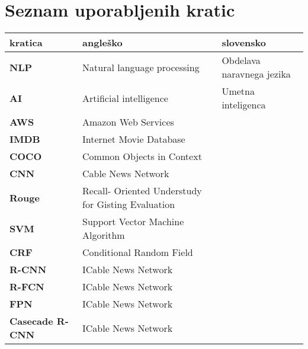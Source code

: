 \chapter*{Seznam uporabljenih kratic}
\begin{center}
\begin{tabular}{l|l|l}
  {\bf kratica} & {\bf angleško} & {\bf slovensko} \\ \hline
    {\bf NLP} & Natural language processing & Obdelava naravnega jezika\\
  {\bf AI} & Artificial intelligence & Umetna inteligenca \\
  {\bf AWS} & Amazon Web Services \\
  {\bf IMDB} & Internet Movie Database  \\
    {\bf COCO} & Common Objects in Context \\
      {\bf CNN} & Cable News Network  \\
        {\bf Rouge} & Recall- Oriented 
        Understudy for Gisting Evaluation \\
          {\bf SVM} & Support Vector Machine Algorithm  \\
          {\bf CRF} & Conditional Random Field  \\
          {\bf R-CNN} & ICable News Network  \\
          {\bf R-FCN} & ICable News Network  \\
          {\bf FPN} & ICable News Network  \\
          {\bf Casecade R-CNN} & ICable News Network  \\
\end{tabular}
\end{center}